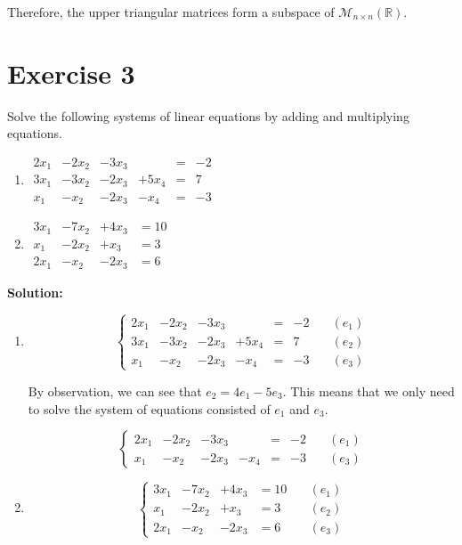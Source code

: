 \documentclass{article}
\begin{document}
Therefore, the upper triangular matrices form a subspace of $\mathcal{M}_{n\times n}(\mathbb{R})$.


\newpage

\section*{Exercise 3}
Solve the following systems of linear equations by adding and multiplying equations.
\begin{enumerate}[label=(\alph*)]
\item $\begin{aligned}
2x_1&-2x_2&-3x_3& &= &-2 \\
3x_1&-3x_2&-2x_3&+5x_4 &= &7 \\
x_1&-x_2&-2x_3&-x_4 &= &-3
\end{aligned}$

\item $\begin{aligned}
3x_1&-7x_2&+4x_3 &= 10 \\
x_1&-2x_2&+x_3 &= 3 \\
2x_1&-x_2&-2x_3 &= 6
\end{aligned}$
\end{enumerate}

\textbf{Solution:} \\

\begin{enumerate}[label=(\alph*)]
\item 
\[\left\{
\begin{aligned}
2x_1&-2x_2&-3x_3& &= &-2 &\quad (e_1)\\
3x_1&-3x_2&-2x_3&+5x_4 &= &7 &\quad (e_2)\\
x_1&-x_2&-2x_3&-x_4 &= &-3 &\quad (e_3)
\end{aligned}
\right.
\]

By observation, we can see that $e_2 = 4e_1 - 5e_3$. This means that we only need to solve the system of equations consisted of $e_1$ and $e_3$.

\[\left\{
\begin{aligned}
2x_1&-2x_2&-3x_3& &= &-2 &\quad (e_1)\\
x_1&-x_2&-2x_3&-x_4 &= &-3 &\quad (e_3)
\end{aligned}
\right.
\]

\item 
\[
\left\{
\begin{aligned}
3x_1&-7x_2&+4x_3 &= 10 &\quad (e_1)\\
x_1&-2x_2&+x_3 &= 3 &\quad (e_2)\\
2x_1&-x_2&-2x_3 &= 6 &\quad (e_3)
\end{aligned}
\right.
\]
\end{enumerate}
\end{document}
